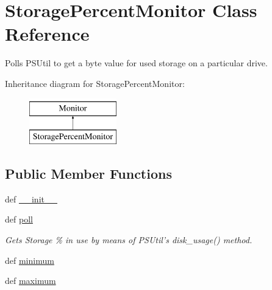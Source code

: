 \hypertarget{classsrc_1_1client_1_1_storage_byte_monitor_1_1_storage_percent_monitor}{\section{Storage\-Percent\-Monitor Class Reference}
\label{classsrc_1_1client_1_1_storage_byte_monitor_1_1_storage_percent_monitor}
}


Polls P\-S\-Util to get a byte value for used storage on a particular drive.  


Inheritance diagram for Storage\-Percent\-Monitor\-:\begin{figure}[H]
\begin{center}
\leavevmode
\includegraphics[height=2.000000cm]{classsrc_1_1client_1_1_storage_byte_monitor_1_1_storage_percent_monitor}
\end{center}
\end{figure}
\subsection*{Public Member Functions}
\begin{DoxyCompactItemize}
\item 
def \hyperlink{classsrc_1_1client_1_1_storage_byte_monitor_1_1_storage_percent_monitor_ac775ee34451fdfa742b318538164070e}{\-\_\-\-\_\-init\-\_\-\-\_\-}
\item 
def \hyperlink{classsrc_1_1client_1_1_storage_byte_monitor_1_1_storage_percent_monitor_a87cd0076a6d482a01482f25a64cf2fb4}{poll}
\begin{DoxyCompactList}\small\item\em Gets Storage \% in use by means of P\-S\-Util's disk\-\_\-usage() method. \end{DoxyCompactList}\item 
def \hyperlink{classsrc_1_1client_1_1_storage_byte_monitor_1_1_storage_percent_monitor_a4515aa6e0be4391413959391fef1109f}{minimum}
\item 
def \hyperlink{classsrc_1_1client_1_1_storage_byte_monitor_1_1_storage_percent_monitor_a8f6589fdc9d322ec8e0dc2c7ede55ce9}{maximum}
\end{DoxyCompactItemize}


